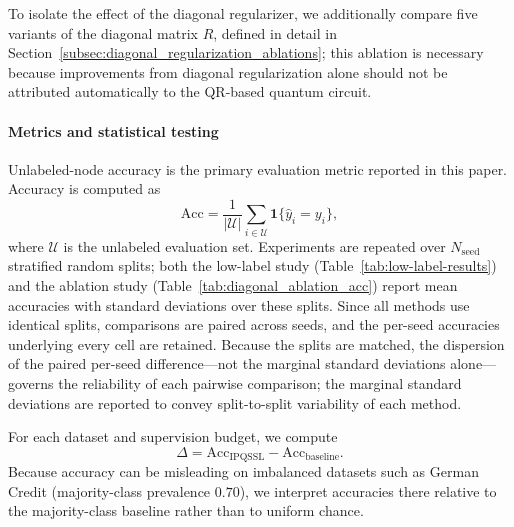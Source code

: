 \documentclass[11pt,a4paper]{article}
\begin{document}
To isolate the effect of the diagonal regularizer, we additionally compare
five variants of the diagonal matrix \(R\), defined in detail in
Section~\ref{subsec:diagonal_regularization_ablations}; this ablation is
necessary because improvements from diagonal regularization alone should
not be attributed automatically to the QR-based quantum circuit.

\paragraph{Metrics and statistical testing}
\label{subsec:metrics}
Unlabeled-node accuracy is the primary evaluation metric reported in this
paper. Accuracy is computed as
\[
    \mathrm{Acc}
    =
    \frac{1}{|\mathcal U|}
    \sum_{i\in\mathcal U}
    \mathbf 1\{\widehat y_i=y_i\},
\]
where \(\mathcal U\) is the unlabeled evaluation set. Experiments are repeated
over \(N_{\mathrm{seed}}\) stratified random splits; both the low-label study
(Table~\ref{tab:low-label-results}) and the ablation study
(Table~\ref{tab:diagonal_ablation_acc}) report mean accuracies with
standard deviations over these splits. Since all methods use identical
splits, comparisons are paired across seeds, and the per-seed accuracies
underlying every cell are retained. Because the splits are matched, the
dispersion of the paired per-seed difference---not the marginal standard
deviations alone---governs the reliability of each pairwise comparison;
the marginal standard deviations are reported to convey split-to-split
variability of each method.

For each dataset and supervision budget, we compute
\[
    \Delta
    =
    \mathrm{Acc}_{\mathrm{IPQSSL}}
    -
    \mathrm{Acc}_{\mathrm{baseline}}.
\]
Because accuracy can be misleading on imbalanced datasets such as German
Credit (majority-class prevalence \(0.70\)), we interpret accuracies there
relative to the majority-class baseline rather than to uniform chance.
\end{document}
